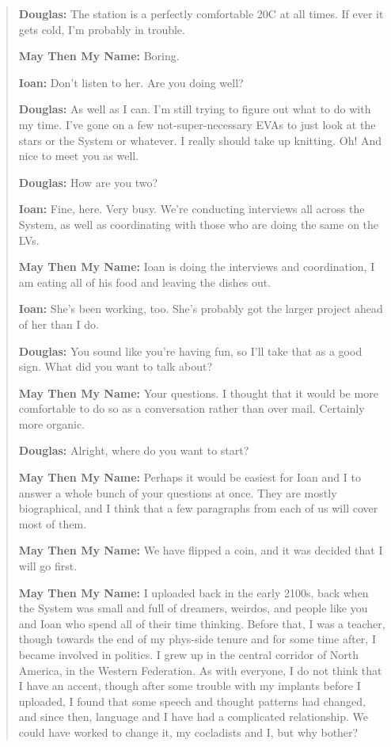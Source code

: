 \begin{quote}
\textbf{Douglas:} The station is a perfectly comfortable 20C at all times. If ever it gets cold, I'm probably in trouble.

\textbf{May Then My Name:} Boring.

\textbf{Ioan:} Don't listen to her. Are you doing well?

\textbf{Douglas:} As well as I can. I'm still trying to figure out what to do with my time. I've gone on a few not-super-necessary EVAs to just look at the stars or the System or whatever. I really should take up knitting. Oh! And nice to meet you as well.

\textbf{Douglas:} How are you two?

\textbf{Ioan:} Fine, here. Very busy. We're conducting interviews all across the System, as well as coordinating with those who are doing the same on the LVs.

\textbf{May Then My Name:} Ioan is doing the interviews and coordination, I am eating all of his food and leaving the dishes out.

\textbf{Ioan:} She's been working, too. She's probably got the larger project ahead of her than I do.

\textbf{Douglas:} You sound like you're having fun, so I'll take that as a good sign. What did you want to talk about?

\textbf{May Then My Name:} Your questions. I thought that it would be more comfortable to do so as a conversation rather than over mail. Certainly more organic.

\textbf{Douglas:} Alright, where do you want to start?

\textbf{May Then My Name:} Perhaps it would be easiest for Ioan and I to answer a whole bunch of your questions at once. They are mostly biographical, and I think that a few paragraphs from each of us will cover most of them.

\textbf{May Then My Name:} We have flipped a coin, and it was decided that I will go first.

\textbf{May Then My Name:} I uploaded back in the early 2100s, back when the System was small and full of dreamers, weirdos, and people like you and Ioan who spend all of their time thinking. Before that, I was a teacher, though towards the end of my phys-side tenure and for some time after, I became involved in politics. I grew up in the central corridor of North America, in the Western Federation. As with everyone, I do not think that I have an accent, though after some trouble with my implants before I uploaded, I found that some speech and thought patterns had changed, and since then, language and I have had a complicated relationship. We could have worked to change it, my cocladists and I, but why bother?


\end{quote}
